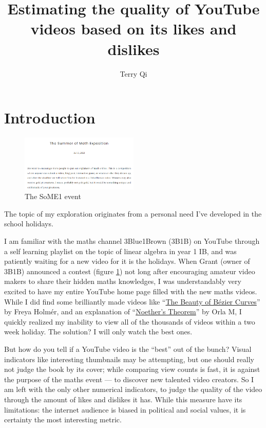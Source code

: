 \documentclass[a4paper,11pt]{article}
\title{\vspace{-8ex}Estimating the quality of YouTube videos based on its likes and dislikes}
\author{Terry Qi}
\date{}
\begin{document}




\maketitle

\section{Introduction}

\begin{figure}
    \centering
    \includegraphics[width=0.5\textwidth]{assets/som1.png}
    \caption{The SoME1 event}
    \label{fig:some1}
\end{figure}

The topic of my exploration originates from a personal need I've developed in the school holidays.

I am familiar with the maths channel 3Blue1Brown (3B1B) on YouTube through a self learning playlist on the topic of linear algebra in year 1 IB, and was patiently waiting for a new video for it is the holidays. When Grant (owner of 3B1B) announced a contest (figure \ref{fig:some1}) not long after encouraging amateur video makers to share their hidden maths knowledges, I was understandably very excited to have my entire YouTube home page filled with the new maths videos. While I did find some brilliantly made videos like ``\href{https://www.youtube.com/watch?v=aVwxzDHniEw}{The Beauty of B\'{e}zier Curves}'' by Freya Holm\'{e}r, and an explanation of ``\href{https://www.youtube.com/watch?v=78wz4KSzUvo}{Noether's Theorem}'' by Orla M, I quickly realized my inability to view all of the thousands of videos within a two week holiday. The solution? I will only watch the best ones.

But how do you tell if a YouTube video is the ``best'' out of the bunch? Visual indicators like interesting thumbnails may be attempting, but one should really not judge the book by its cover; while comparing view counts is fast, it is against the purpose of the maths event --- to discover new talented video creators. So I am left with the only other numerical indicators, to judge the quality of the video through the amount of likes and dislikes it has. While this measure have its limitations: the internet audience is biased in political and social values, it is certainty the most interesting metric.
\end{document}
